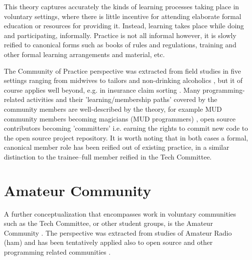 \documentclass{acm_proc_article-sp}
\begin{document}
This theory captures accurately the kinds of learning processes taking place in voluntary settings, where there is little incentive for attending elaborate formal education or resources for providing it. Instead, learning takes place while doing and participating, informally.
Practice is not all informal however, it is slowly reified \cite{wenger98} to canonical forms such as books of rules and regulations, training and other formal learning arrangements and material, etc. 

The Community of Practice perspective was extracted from field studies in five settings ranging from midwives to tailors and non-drinking alcoholics \cite{lave_wenger91}, but it of course applies well beyond, e.g. in insurance claim sorting \cite{wenger98}. Many programming-related activities and their 'learning/membership paths' covered by the community members are well-described by the theory, for example MUD community members becoming magicians (MUD programmers) \cite{pargman00, pargman05}, open source contributors becoming 'committers' i.e. earning the rights to commit new code to the open source project repository. It is worth noting that in both cases a formal, canonical member role has been reified out of existing practice, in a similar distinction to the trainee--full member reified in the Tech Committee.

\section{Amateur Community}\label{sec:amateur}
A further conceptualization that encompasses work in voluntary communities such as the Tech Committee, or other student groups, is the Amateur Community \cite{bogdan03, bogdan_bowers07}. The perspective was extracted from studies of Amateur Radio (ham) \cite{bogdan_bowers07} and has been tentatively applied also to open source and other programming related communities \cite{bogdan03}. 
\end{document}
